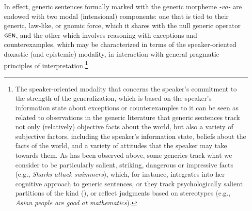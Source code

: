 \documentclass[output=paper,colorlinks,citecolor=brown]{langscibook}
\begin{document}
\noindent In effect, generic sentences formally marked with the
generic morpheme \textit{-va-} are endowed with two modal (intensional) components: one that is tied to their generic, law-like, or gnomic force, which it shares with the null generic operator $\cnst{Gen}$, and the other which involves reasoning with exceptions and counterexamples,  which
may be characterized in terms of the speaker-oriented doxastic (and epistemic) modality, in interaction with general pragmatic principles of interpretation.\footnote{The speaker-oriented modality that concerns the speaker's commitment to the strength of the generalization, which is  based on the speaker's information state about exceptions or counterexamples to it can be seen as related to observations in the generic literature that
generic sentences track not only (relatively)
objective facts about the world, but also a variety of subjective factors,
including the speaker's information state, beliefs about the facts of the world, and a variety of attitudes that
the speaker may take towards them.
As has been observed above,
some generics track what we
consider to be particularly salient,
striking, dangerous or impressive facts (e.g., \textit{Sharks attack swimmers}), which, for instance, \citet{leslie2008} integrates into her cognitive approach to generic sentences, or they track
psychologically salient partitions of the kind (\citealt{cohen2004}), or reflect judgments based on stereotypes (e.g., \textit{Asian people are good at mathematics}).}
\end{document}
